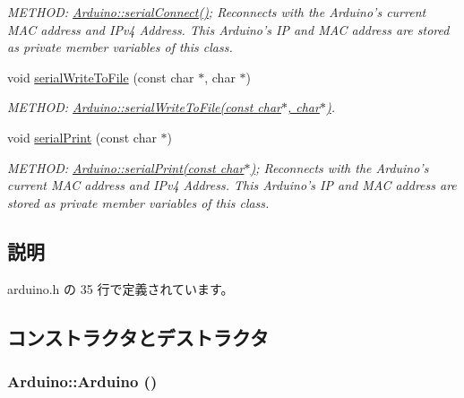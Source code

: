 \begin{DoxyCompactItemize}
\begin{DoxyCompactList}\small\item\em METHOD: \hyperlink{classArduino_a34745ece538758a361a16beae91f8619_a34745ece538758a361a16beae91f8619}{Arduino::serialConnect()}; Reconnects with the Arduino's current MAC address and IPv4 Address. This Arduino's IP and MAC address are stored as private member variables of this class. \item\end{DoxyCompactList}\item 
void \hyperlink{classArduino_a0359a1c739e959b478b8756517adbde9_a0359a1c739e959b478b8756517adbde9}{serialWriteToFile} (const char $\ast$, char $\ast$)
\begin{DoxyCompactList}\small\item\em METHOD: \hyperlink{classArduino_a0359a1c739e959b478b8756517adbde9_a0359a1c739e959b478b8756517adbde9}{Arduino::serialWriteToFile(const char$\ast$, char$\ast$)}. \item\end{DoxyCompactList}\item 
void \hyperlink{classArduino_a69177b866c5c37541d7e860c4e9ae3d7_a69177b866c5c37541d7e860c4e9ae3d7}{serialPrint} (const char $\ast$)
\begin{DoxyCompactList}\small\item\em METHOD: \hyperlink{classArduino_a69177b866c5c37541d7e860c4e9ae3d7_a69177b866c5c37541d7e860c4e9ae3d7}{Arduino::serialPrint(const char$\ast$)}; Reconnects with the Arduino's current MAC address and IPv4 Address. This Arduino's IP and MAC address are stored as private member variables of this class. \item\end{DoxyCompactList}\end{DoxyCompactItemize}


\subsection{説明}


 arduino.h の 35 行で定義されています。

\subsection{コンストラクタとデストラクタ}
\hypertarget{classArduino_a625b4d718e488c7a7c13593b8abf9a43_a625b4d718e488c7a7c13593b8abf9a43}{
\subsubsection[{Arduino}]{\setlength{\rightskip}{0pt plus 5cm}Arduino::Arduino ()}}
\label{classArduino_a625b4d718e488c7a7c13593b8abf9a43_a625b4d718e488c7a7c13593b8abf9a43}


